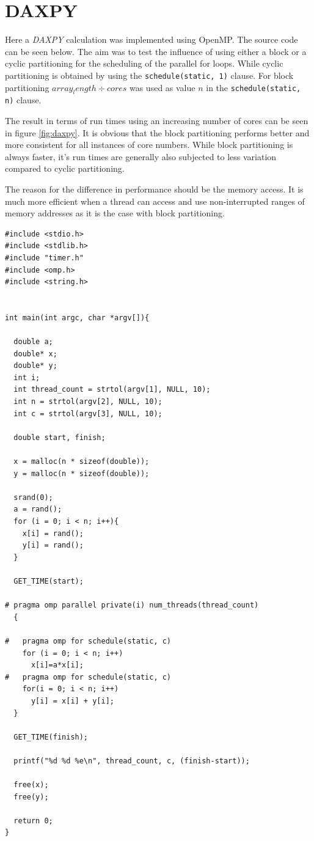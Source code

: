\documentclass[a4paper,11pt,twoside]{article}
\begin{document}
\section{DAXPY}
Here a \textit{DAXPY} calculation was implemented using OpenMP. The source code can be seen below. The aim was to test the influence of using either a block or a cyclic partitioning for the scheduling of the parallel for loops. While cyclic partitioning is obtained by using the \verb+schedule(static, 1)+ clause. For block partitioning $array_length \div cores$ was used as value $n$ in the \verb+schedule(static, n)+ clause.

 The result in terms of run times using an increasing number of cores can be seen in figure \ref{fig:daxpy}. It is obvious that the block partitioning performs better and more consistent for all instances of core numbers. While block partitioning is always faster, it's run times are generally also subjected to less variation compared to cyclic partitioning.

The reason for the difference in performance should be the memory access. It is much more efficient when a thread can access and use non-interrupted ranges of memory addresses as it is the case with block partitioning.  
 
\begin{verbatim}
#include <stdio.h>
#include <stdlib.h>
#include "timer.h"
#include <omp.h>
#include <string.h>


int main(int argc, char *argv[]){

  double a;
  double* x;
  double* y;
  int i;
  int thread_count = strtol(argv[1], NULL, 10);
  int n = strtol(argv[2], NULL, 10);
  int c = strtol(argv[3], NULL, 10);
  
  double start, finish;

  x = malloc(n * sizeof(double));
  y = malloc(n * sizeof(double));
  
  srand(0);
  a = rand();
  for (i = 0; i < n; i++){
    x[i] = rand();
    y[i] = rand();
  }
  
  GET_TIME(start);

# pragma omp parallel private(i) num_threads(thread_count)
  {

#   pragma omp for schedule(static, c)
    for (i = 0; i < n; i++)
      x[i]=a*x[i];
#   pragma omp for schedule(static, c)
    for(i = 0; i < n; i++)
      y[i] = x[i] + y[i];
  }

  GET_TIME(finish);

  printf("%d %d %e\n", thread_count, c, (finish-start));

  free(x);
  free(y);

  return 0;
}

\end{verbatim}
\end{document}
